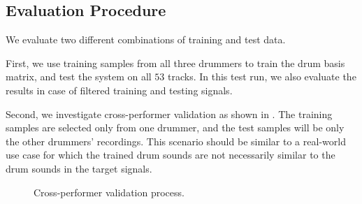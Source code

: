 \documentclass{article}
\begin{document}
\subsection{Evaluation Procedure}\label{subsec:evaluation procedure}


We evaluate two different combinations of training and test data. 

First, we use training samples from all three drummers to train the drum basis matrix, and test the system on all $53$ tracks. In this test run, we also evaluate the results in case of filtered training and testing signals. %

Second, we investigate cross-performer validation as shown in . The training samples are selected only from one drummer, and the test samples will be only the other drummers' recordings. This scenario should be similar to a real-world use case for which the trained drum sounds are not necessarily similar to the drum sounds in the target signals.

\begin{figure}
 \centerline{}
 \caption{Cross-performer validation process.}
 \label{fig:cross}
\end{figure}
\end{document}
